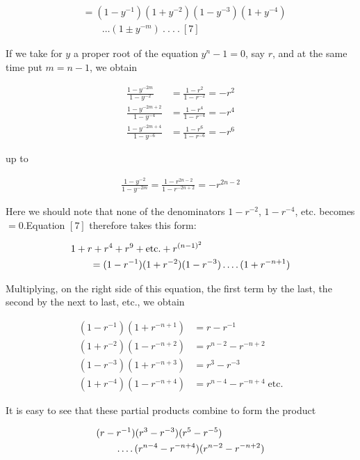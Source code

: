 \[
\begin{aligned}
&=(1-y^{-1})(1+y^{-2})(1-y^{-3})(1+y^{-4})\\&\qquad\ldots(1\pm y^{-m})\  .\  .\  .\  .\ [7]
\end{aligned}
\]

If we take for $y$ a proper root of the equation $y^n-1=0$, say $r$, and at the same time put $m=n-1$, we obtain

\[
\begin{aligned}
\frac{1-y^{-2m}}{1-y^{-2}}&=\frac{1-r^2}{1-r^{-2}}=-r^2\\
\frac{1-y^{-2m+2}}{1-y^{-4}}&=\frac{1-r^4}{1-r^{-4}}=-r^4\\
\frac{1-y^{-2m+4}}{1-y^{-6}}&=\frac{1-r^6}{1-r^{-6}}=-r^6
\end{aligned}
\]

up to

\[
\begin{aligned}
\frac{1-y^{-2}}{1-y^{-2m}}=\frac{1-r^{2n-2}}{1-r^{-2n+2}}=-r^{2n-2}
\end{aligned}
\]

Here we should note that none of the denominators $1-r^{-2}$, $1-r^{-4}$, etc. becomes $=0$.\quad Equation $[7]$ therefore takes this form:

\[
\begin{aligned}
&1+r+r^4+r^9+\text{etc.}+r^{(n-1)^2}\\&\qquad=(1-r^{-1})(1+r^{-2})(1-r^{-3})\mathinner{.\,.\,.\,.}(1+r^{-n+1})
\end{aligned}
\]

Multiplying, on the right side of this equation, the first term by the last, the second by the next to last, etc., we obtain

\[
\begin{aligned}
(1-r^{-1})(1+r^{-n+1})&=r-r^{-1}\\
(1+r^{-2})(1-r^{-n+2})&=r^{n-2}-r^{-n+2}\\
(1-r^{-3})(1+r^{-n+3})&=r^3-r^{-3}\\
(1+r^{-4})(1-r^{-n+4})&=r^{n-4}-r^{-n+4}\;\text{etc.}
\end{aligned}
\]

It is easy to see that these partial products combine to form the product

\[
\begin{aligned}
&(r-r^{-1})(r^3-r^{-3})(r^5-r^{-5})\\&\qquad\mathinner{.\,.\,.\,.}(r^{n-4}-r^{-n+4})(r^{n-2}-r^{-n+2})
\end{aligned}
\]

